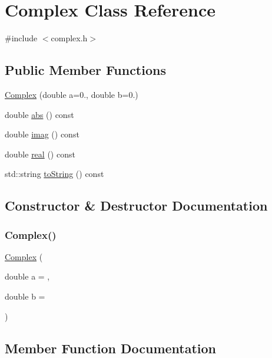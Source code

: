 \hypertarget{classComplex}{}\section{Complex Class Reference}
\label{classComplex}


{\ttfamily \#include $<$complex.\+h$>$}

\subsection*{Public Member Functions}
\begin{DoxyCompactItemize}
\item 
\mbox{\hyperlink{classComplex_a900a80f2ea5c0c3dc9393402b6ce8df3}{Complex}} (double a=0., double b=0.)
\item 
double \mbox{\hyperlink{classComplex_ad534b137e1216937005dd363a5579ed0}{abs}} () const
\item 
double \mbox{\hyperlink{classComplex_ac6d0f1ec6a24b5904bc3a206b3c117ff}{imag}} () const
\item 
double \mbox{\hyperlink{classComplex_a3a3f678878dde3a729f94dfefbdc4ef2}{real}} () const
\item 
std\+::string \mbox{\hyperlink{classComplex_a1fe5121d6528fdea3f243321b3fa3a49}{to\+String}} () const
\end{DoxyCompactItemize}


\subsection{Constructor \& Destructor Documentation}
\mbox{\label{classComplex_a900a80f2ea5c0c3dc9393402b6ce8df3}} 
\subsubsection{\texorpdfstring{Complex()}{Complex()}}
{\footnotesize\ttfamily \mbox{\hyperlink{classComplex}{Complex}} (\begin{DoxyParamCaption}\item[{double}]{a = {},  }\item[{double}]{b = {} }\end{DoxyParamCaption})}



\subsection{Member Function Documentation}
\mbox{\label{classComplex_ad534b137e1216937005dd363a5579ed0}} 
